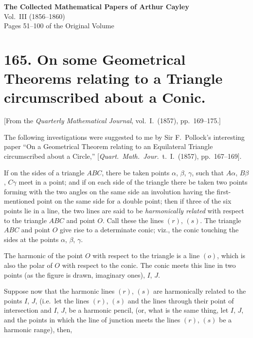 \documentclass[11pt,a4paper]{article}
\theoremstyle{plain}
\begin{document}
\begin{center}
{\Large\bfseries The Collected Mathematical Papers of Arthur Cayley}\\[6pt]
{\large Vol.~III (1856--1860)}\\[12pt]
{\large Pages 51--100 of the Original Volume}
\end{center}

\vspace{1em}


\section*{165. On some Geometrical Theorems relating to a Triangle circumscribed about a Conic.}

[From the \textit{Quarterly Mathematical Journal}, vol.~I.~(1857), pp.~169--175.]

The following investigations were suggested to me by Sir F.~Pollock's interesting paper ``On a Geometrical Theorem relating to an Equilateral Triangle circumscribed about a Circle,'' [\textit{Quart.\ Math.\ Jour.}\ t.~I.~(1857), pp.~167--169].

If on the sides of a triangle $ABC$, there be taken points $\alpha$, $\beta$, $\gamma$, such that $A\alpha$, $B\beta$, $C\gamma$ meet in a point; and if on each side of the triangle there be taken two points forming with the two angles on the same side an involution having the first-mentioned point on the same side for a double point; then if three of the six points lie in a line, the two lines are said to be \textit{harmonically related} with respect to the triangle $ABC$ and point $O$. Call these the lines $(r)$, $(s)$. The triangle $ABC$ and point $O$ give rise to a determinate conic; viz., the conic touching the sides at the points $\alpha$, $\beta$, $\gamma$.

The harmonic of the point $O$ with respect to the triangle is a line $(o)$, which is also the polar of $O$ with respect to the conic. The conic meets this line in two points (as the figure is drawn, imaginary ones), $I$, $J$.

Suppose now that the harmonic lines $(r)$, $(s)$ are harmonically related to the points $I$, $J$, (i.e.\ let the lines $(r)$, $(s)$ and the lines through their point of intersection and $I$, $J$, be a harmonic pencil, (or, what is the same thing, let $I$, $J$, and the points in which the line of junction meets the lines $(r)$, $(s)$ be a harmonic range), then,
\end{document}
